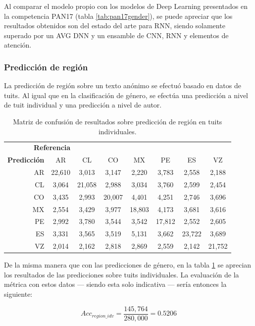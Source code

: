 Al comparar el modelo propio con los modelos de Deep Learning presentados en la competencia PAN17 (tabla \ref{tab:pan17gender}), se puede apreciar que los resultados obtenidos son del estado del arte para RNN, siendo solamente superado por un AVG DNN y un ensamble de CNN, RNN y elementos de atención.

\subsubsection{Predicción de región}

La predicción de región sobre un texto anónimo se efectuó basado en datos de tuits. Al igual que en la clasificación de género, se efectúa una predicción a nivel de tuit individual y una predicción a nivel de autor.

\begin{table}
\centering
\begin{tabular}{r | c c c c c c c}
\multicolumn{3}{c}{\textbf{Referencia}} \\
\textbf{Predicción} & AR & CL & CO & MX & PE & ES & VZ\\
\hline
AR & 22,610 & 3,013 & 3,147 & 2,220 & 3,783 & 2,558 & 2,188 \\
CL & 3,064 & 21,058 & 2,988 & 3,034 & 3,760 & 2,599 & 2,454 \\
CO & 3,435 & 2,993 & 20,007 & 4,401 & 4,251 & 2,746 & 3,696 \\
MX & 2,554 & 3,429 & 3,977 & 18,803 & 4,173 & 3,681 & 3,616 \\
PE & 2,992 & 3,780 & 3,544 & 3,542 & 17,812 & 2,552 & 2,605 \\
ES & 3,331 & 3,565 & 3,519 & 5,131 & 3,662 & 23,722 & 3,689 \\
VZ & 2,014 & 2,162 & 2,818 & 2,869 & 2,559 & 2,142 & 21,752 \\
\end{tabular}
\caption{Matriz de confusión de resultados sobre predicción de región en tuits individuales.}
\label{tab:region_indvtweet}
\end{table}

De la misma manera que con las predicciones de género, en la tabla \ref{tab:region_indvtweet} se aprecian los resultados de las predicciones sobre tuits individuales. La evaluación de la métrica con estos datos --- siendo esta solo indicativa --- sería entonces la siguiente:

$$ Acc_{region\_idv} = \frac{145,764}{280,000} = 0\text{.}5206 $$

